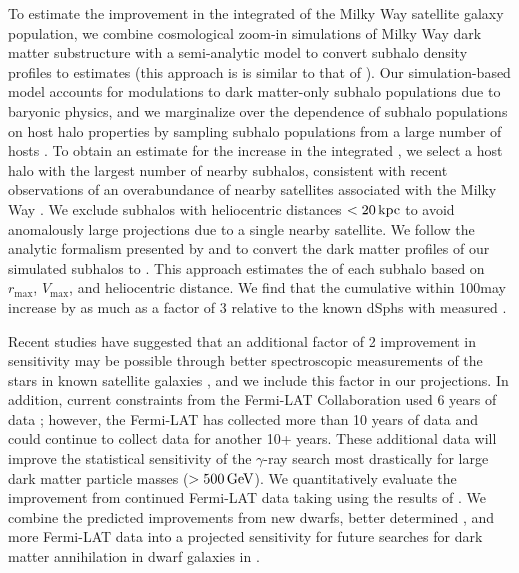 To estimate the improvement in the integrated \Jfactor of the Milky Way satellite galaxy population, we combine cosmological zoom-in simulations of Milky Way dark matter substructure with a semi-analytic model to convert subhalo density profiles to \Jfactor estimates (this approach is is similar to that of \citealt{1309.4780}). 
Our simulation-based model accounts for modulations to dark matter-only subhalo populations due to baryonic physics, and we marginalize over the dependence of subhalo populations on host halo properties by sampling subhalo populations from a large number of hosts \citep{Nadler:2018}. 
To obtain an estimate for the increase in the integrated \Jfactor, we select a host halo with the largest number of nearby subhalos, consistent with recent observations of an overabundance of nearby satellites associated with the Milky Way \citep{Kim:2017iwr, Graus:2018}. 
We exclude subhalos with heliocentric distances $< 20 \mathrm{\,kpc}$ to avoid anomalously large projections due to a single nearby satellite.
We follow the analytic formalism presented by \citet{1604.05599} and \citet{1802.06811} to convert the dark matter profiles of our simulated subhalos to \Jfactors.  
This approach estimates the \Jfactor of each subhalo based on $r_{\max}$, $V_{\max}$, and heliocentric distance. 
We find that the cumulative \Jfactor within 100\kpc may increase by as much as a factor of 3 relative to the known dSphs with measured \Jfactors. 

Recent studies have suggested that an additional factor of 2 improvement in sensitivity may be possible through better spectroscopic measurements  of the stars in known satellite galaxies \citep{Albert:2017}, and we include this factor in our projections.
In addition, current constraints from the Fermi-LAT Collaboration used 6 years of data \citep{Ackermann:2015}; however, the Fermi-LAT has collected more than 10 years of data and could continue to collect data for another 10+ years.
These additional data will improve the statistical sensitivity of the $\gamma$-ray search most drastically for large dark matter particle masses ($>500\mathrm{\,GeV}$).
We quantitatively evaluate the improvement from continued Fermi-LAT data taking using the results of \cite{Charles:2016}.
We combine the predicted improvements from new dwarfs, better determined \Jfactors, and more Fermi-LAT data into a projected sensitivity for future searches for dark matter annihilation in dwarf galaxies in .


